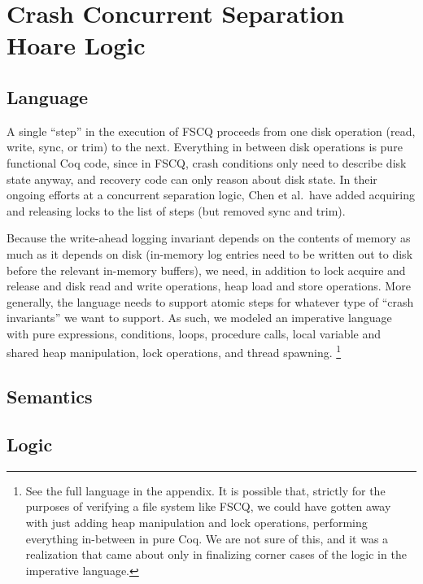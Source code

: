 
\section{Crash Concurrent Separation Hoare Logic}

\subsection{Language}

A single ``step'' in the execution of FSCQ proceeds from one disk operation
(read, write, sync, or trim) to the next.
Everything in between disk operations
is pure functional Coq code, since in FSCQ, crash conditions only need to
describe disk state anyway, and recovery code can only reason about disk state.
In their ongoing efforts at a concurrent separation logic, Chen et al.\ have
added acquiring and releasing locks to the list of steps (but removed sync and
trim).

Because the write-ahead logging invariant depends on the contents of memory as
much as it depends on disk (in-memory log entries need to be written out to disk
before the relevant in-memory buffers), we need, in addition to lock acquire and
release and disk read and write operations, heap load and store
operations.
More
generally, the language needs to support atomic steps for whatever type of
``crash invariants'' we want to support.
As such, we modeled an imperative
language with pure expressions, conditions, loops, procedure calls, local
variable and shared heap manipulation, lock operations, and thread
spawning.
\footnote{See the full language in the appendix.
It is possible that,
strictly for the purposes of verifying a file system like FSCQ, we could have
gotten away with just adding heap manipulation and lock operations, performing
everything in-between in pure Coq.
We are not sure of this, and it was a
realization that came about only in finalizing corner cases of the logic in the
imperative language.}


\subsection{Semantics}

\subsection{Logic}

